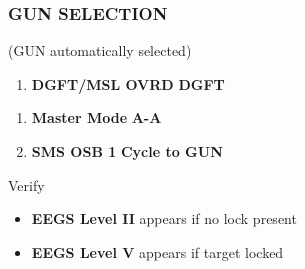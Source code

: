 \subsubsection{GUN SELECTION}
\label{subsec:m61:selection}
\begin{checklistitemize}
    (GUN automatically selected)
    \begin{enumerate}
        \item \textbf{DGFT/MSL OVRD} \dotfill \textbf{DGFT}
    \end{enumerate}
    \begin{enumerate}
        \item \textbf{Master Mode} \dotfill \textbf{A-A}
        \item \textbf{SMS OSB 1} \dotfill \textbf{Cycle to GUN}
    \end{enumerate}
     Verify
    \begin{itemize}
        \item \textbf{EEGS Level II} appears if no lock present
        \item \textbf{EEGS Level V} appears if target locked
    \end{itemize}
\end{checklistitemize}

